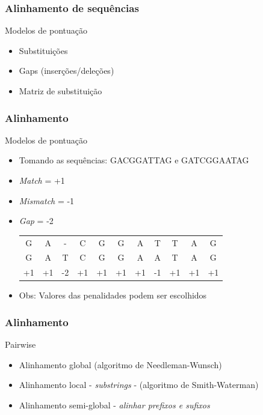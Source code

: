 \documentclass{beamer}
\begin{document}
	\begin{frame}\frametitle{Alinhamento de sequências}
	\begin{block}{Modelos de pontuação}
		\begin{itemize}
			\item Substituições
			\item Gaps (inserções/deleções)
			\item Matriz de substituição
		\end{itemize}
	\end{block}
	\end{frame}
	\begin{frame}\frametitle{Alinhamento}
	\begin{block}{Modelos de pontuação}
	\begin{itemize}
		\item Tomando as sequências: GACGGATTAG e GATCGGAATAG
		\item \textit{Match} = +1
		\item \textit{Mismatch} = -1
		\item \textit{Gap} = -2
		\begin{table}
			\begin{tabular}{ccccccccccc}
				G  & A  & -  & C  & G  & G  & A  & T  & T  & A  & G  \\
				G  & A  & T  & C  & G  & G  & A  & A  & T  & A  & G  \\ \hline
				+1 & +1 & -2 & +1 & +1 & +1 & +1 & -1 & +1 & +1 & +1 \\
			\end{tabular}
		\end{table}
		\item Obs: Valores das penalidades podem ser escolhidos
	\end{itemize}
	\end{block}
	\end{frame}

	\begin{frame}\frametitle{Alinhamento}
	\begin{block}{Pairwise}
		\begin{itemize}
			\item Alinhamento global (algoritmo de Needleman-Wunsch)
			\item Alinhamento local - \textit{substrings} - (algoritmo de Smith-Waterman)
			\item Alinhamento semi-global - \textit{alinhar prefixos e sufixos}
		\end{itemize}
	\end{block}
	\end{frame}
\end{document}
